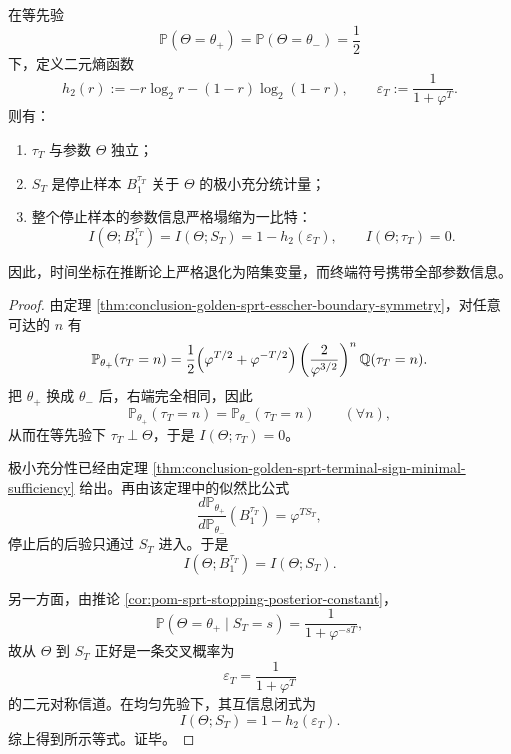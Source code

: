 \begin{theorem}\label{thm:conclusion-golden-sprt-onebit-ancillary}
在等先验
\[
\mathbb P(\Theta=\theta_+)=\mathbb P(\Theta=\theta_-)=\frac12
\]
下，定义二元熵函数
\[
h_2(r):=-r\log_2 r-(1-r)\log_2(1-r),
\qquad
\varepsilon_T:=\frac{1}{1+\varphi^T}.
\]
则有：
\begin{enumerate}
  \item \(\tau_T\) 与参数 \(\Theta\) 独立；
  \item \(S_T\) 是停止样本 \(B_1^{\tau_T}\) 关于 \(\Theta\) 的极小充分统计量；
  \item 整个停止样本的参数信息严格塌缩为一比特：
  \[
  \boxed{\;
  I(\Theta;B_1^{\tau_T})
  =
  I(\Theta;S_T)
  =
  1-h_2(\varepsilon_T),
  \qquad
  I(\Theta;\tau_T)=0.
  \;}
  \]
\end{enumerate}
因此，时间坐标在推断论上严格退化为陪集变量，而终端符号携带全部参数信息。
\end{theorem}
\begin{proof}
由定理 \ref{thm:conclusion-golden-sprt-esscher-boundary-symmetry}，对任意可达的 \(n\) 有
\[
\mathbb P_{\theta_+}(\tau_T=n)
=
\frac12\Bigl(\varphi^{T/2}+\varphi^{-T/2}\Bigr)
\left(\frac{2}{\varphi^{3/2}}\right)^n
\mathbb Q(\tau_T=n).
\]
把 \(\theta_+\) 换成 \(\theta_-\) 后，右端完全相同，因此
\[
\mathbb P_{\theta_+}(\tau_T=n)=\mathbb P_{\theta_-}(\tau_T=n)
\qquad
(\forall n),
\]
从而在等先验下 \(\tau_T\perp \Theta\)，于是 \(I(\Theta;\tau_T)=0\)。

极小充分性已经由定理 \ref{thm:conclusion-golden-sprt-terminal-sign-minimal-sufficiency} 给出。再由该定理中的似然比公式
\[
\frac{d\mathbb P_{\theta_+}}{d\mathbb P_{\theta_-}}(B_1^{\tau_T})
=
\varphi^{TS_T},
\]
停止后的后验只通过 \(S_T\) 进入。于是
\[
I(\Theta;B_1^{\tau_T})=I(\Theta;S_T).
\]

另一方面，由推论 \ref{cor:pom-sprt-stopping-posterior-constant}，
\[
\mathbb P(\Theta=\theta_+\mid S_T=s)
=
\frac{1}{1+\varphi^{-sT}},
\]
故从 \(\Theta\) 到 \(S_T\) 正好是一条交叉概率为
\[
\varepsilon_T=\frac{1}{1+\varphi^T}
\]
的二元对称信道。在均匀先验下，其互信息闭式为
\[
I(\Theta;S_T)=1-h_2(\varepsilon_T).
\]
综上得到所示等式。证毕。
\end{proof}

